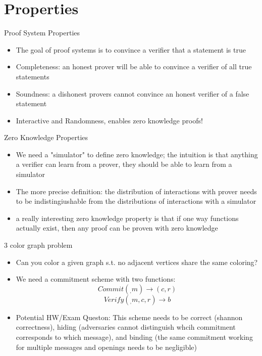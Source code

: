 \documentclass[handout]{beamer}
\begin{document}
\section{Properties}

\begin{frame}{Proof System Properties}
    \begin{itemize}
        \item \pause The goal of proof systems is to convince a verifier that a statement is true
        \item \pause Completeness: an honest prover will be able to convince a verifier of all true statements
        \item \pause Soundness: a dishonest provers cannot convince an honest verifier of a false statement
        \item \pause Interactive and Randomness, enables zero knowledge proofs!
    \end{itemize}
\end{frame}

\begin{frame}{Zero Knowledge Properties}
    \begin{itemize}
        \item \pause We need a "simulator" to define zero knowledge; the intuition is that anything a verifier can learn from a prover, they should be able to learn from a simulator
        \item \pause The more precise definition: the distribution of interactions with prover needs to be indistingiushable from the distributions of interactions with a simulator
        \item \pause a really interesting zero knowledge property is that if one way functions actually exist, then any proof can be proven with zero knowledge
    \end{itemize}
\end{frame}

\begin{frame}{3 color graph problem}
    \begin{itemize}
        \item \pause Can you color a given graph s.t. no adjacent vertices share the same coloring?
        \item \pause We need a commitment scheme with two functions: \[Commit(_, m) \rightarrow (c, r)\] \[Verify(_, m, c, r) \rightarrow b\]
        \item \pause Potential HW/Exam Queston: This scheme needs to be correct (shannon correctness), hiding (adversaries cannot distinguish whcih commitment corresponds to which message), and binding (the same commitment working for multiple messages and openings needs to be negligible)
    \end{itemize}
\end{frame}
\end{document}
